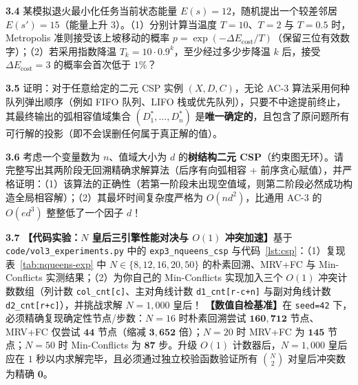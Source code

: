 \textbf{3.4} \quad 某模拟退火最小化任务当前状态能量 $E(s) = 12$，随机提出一个较差邻居 $E(s') = 15$（能量上升 $3$）。（1）分别计算当温度 $T = 10$、$T = 2$ 与 $T = 0.5$ 时，Metropolis 准则接受该上坡移动的概率 $p = \exp(-\Delta E_{\text{cost}} / T)$（保留三位有效数字）；（2）若采用指数降温 $T_k = 10 \cdot 0.9^k$，至少经过多少步降温 $k$ 后，接受 $\Delta E_{\text{cost}} = 3$ 的概率会首次低于 $1\%$？


\textbf{3.5} \quad 证明：对于任意给定的二元 CSP 实例 $(X, D, C)$，无论 AC-3 算法采用何种队列弹出顺序（例如 FIFO 队列、LIFO 栈或优先队列），只要不中途提前终止，其最终输出的弧相容值域集合 $(D_1^*, \dots, D_n^*)$ 是\textbf{唯一确定的}，且包含了原问题所有可行解的投影（即不会误删任何属于真正解的值）。

\textbf{3.6} \quad 考虑一个变量数为 $n$、值域大小为 $d$ 的\textbf{树结构二元 CSP}（约束图无环）。请完整写出其两阶段无回溯精确求解算法（后序有向弧相容 + 前序贪心赋值），并严格证明：（1）该算法的正确性（若第一阶段未出现空值域，则第二阶段必然成功构造全局相容解）；（2）其最坏时间复杂度严格为 $O(n d^2)$，比通用 AC-3 的 $O(e d^3)$ 整整低了一个因子 $d$！


\textbf{3.7} \quad \textbf{【代码实验：$N$ 皇后三引擎性能对决与 $O(1)$ 冲突加速】}基于 \texttt{code/vol3\_experiments.py} 中的 \texttt{exp3\_nqueens\_csp} 与代码~\ref{lst:csp}：（1）复现表~\ref{tab:nqueens-exp} 中 $N \in \{8, 12, 16, 20, 50\}$ 的朴素回溯、MRV+FC 与 Min-Conflicts 实测结果；（2）为你自己的 Min-Conflicts 实现加入三个 $O(1)$ 冲突计数数组（列计数 \texttt{col\_cnt[c]}、主对角线计数 \texttt{d1\_cnt[r-c+n]} 与副对角线计数 \texttt{d2\_cnt[r+c]}），并挑战求解 $N = 1{,}000$ 皇后！
\textbf{【数值自检基准】}在 \texttt{seed=42} 下，必须精确复现确定性节点/步数：$N=16$ 时朴素回溯尝试 $\mathbf{160{,}712}$ 节点、MRV+FC 仅尝试 $\mathbf{44}$ 节点（缩减 $\mathbf{3{,}652}$ 倍）；$N=20$ 时 MRV+FC 为 $\mathbf{145}$ 节点；$N=50$ 时 Min-Conflicts 为 $\mathbf{87}$ 步。升级 $O(1)$ 计数器后，$N=1{,}000$ 皇后应在 $1$ 秒以内求解完毕，且必须通过独立校验函数验证所有 $\binom{N}{2}$ 对皇后冲突数为精确 $\mathbf{0}$。

